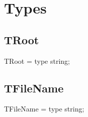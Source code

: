 \documentclass{report}
\newif\ifpdf
\begin{document}
\section{Types}
\ifpdf
\subsection*{\large{\textbf{TRoot}}\normalsize\hspace{1ex}\hrulefill}
\else
\subsection*{TRoot}
\fi
\label{ok_alias_string-TRoot}
\begin{list}{}{
\setlength{\itemindent}{0cm}
\setlength{\listparindent}{0cm}
\setlength{\leftmargin}{\evensidemargin}
\addtolength{\leftmargin}{\tmplength}
\settowidth{\labelsep}{X}
\addtolength{\leftmargin}{\labelsep}
\setlength{\labelwidth}{\tmplength}
}
\item[\textbf{Declaration}\hfill]
\ifpdf
\begin{flushleft}
\fi
\begin{ttfamily}
TRoot = type string;\end{ttfamily}

\ifpdf
\end{flushleft}
\fi

\end{list}
\ifpdf
\subsection*{\large{\textbf{TFileName}}\normalsize\hspace{1ex}\hrulefill}
\else
\subsection*{TFileName}
\fi
\label{ok_alias_string-TFileName}
\begin{list}{}{
\setlength{\itemindent}{0cm}
\setlength{\listparindent}{0cm}
\setlength{\leftmargin}{\evensidemargin}
\addtolength{\leftmargin}{\tmplength}
\settowidth{\labelsep}{X}
\addtolength{\leftmargin}{\labelsep}
\setlength{\labelwidth}{\tmplength}
}
\item[\textbf{Declaration}\hfill]
\ifpdf
\begin{flushleft}
\fi
\begin{ttfamily}
TFileName = type string;\end{ttfamily}

\ifpdf
\end{flushleft}
\fi

\end{list}
\ifpdf
\end{document}
